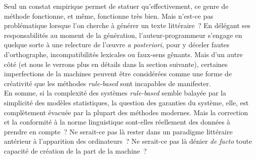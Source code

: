 \documentclass{article}
\begin{document}
			Seul un constat empirique permet de statuer qu'effectivement, ce genre de méthode fonctionne, et même, fonctionne très bien. Mais n'est-ce pas problématique lorsque l'on cherche à générer un texte littéraire~? En délégant ses responsabilités au moment de la génération, l'auteur-programmeur s'engage en quelque sorte à une relecture de l'œuvre \textit{a posteriori}, pour y déceler fautes d'orthographe, incompatibilités lexicales ou faux-sens gênants. Mais d'un autre côté (et nous le verrons plus en détails dans la section suivante), certaines imperfections de la machines peuvent être considérées comme une forme de créativité que les méthodes \textit{rule-based} sont incapables de manifester.\\
			
			En somme, si la complexité des systèmes \textit{rule-based} semble balayée par la simplicité des modèles statistiques, la question des garanties du système, elle, est complètement évacuée par la plupart des méthodes modernes. Mais la correction et la conformité à la norme linguistique sont-elles réellement des données à prendre en compte~? Ne serait-ce pas là rester dans un paradigme littéraire antérieur à l'apparition des ordinateurs~? Ne serait-ce pas là dénier \textit{de facto} toute capacité de création de la part de la machine~?
		\newpage
\end{document}
